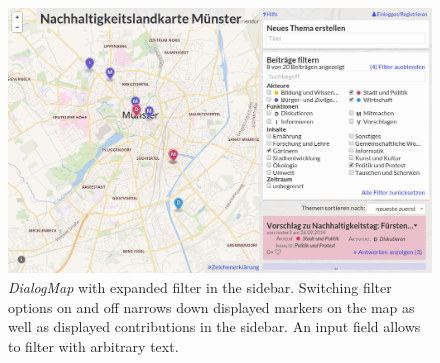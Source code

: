 \begin{figure}[!h]
    \centering
    \includegraphics[width=1\columnwidth]{images/screenshot_filters}
    \caption{\textit{DialogMap} with expanded filter in the sidebar. Switching filter options on and off narrows down displayed markers on the map as well as displayed contributions in the sidebar. An input field allows to filter with arbitrary text.}
    \label{fig:screenshot_filter}
\end{figure}


